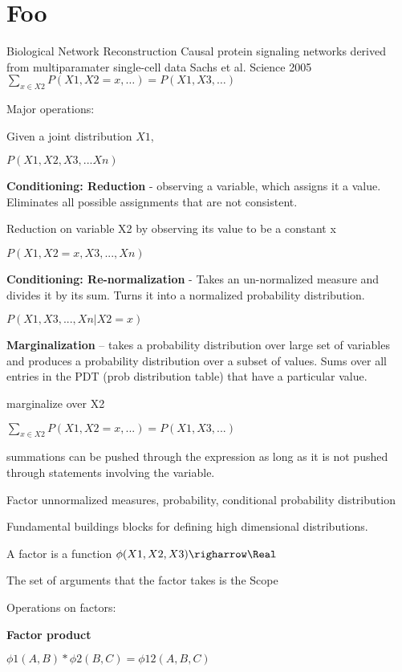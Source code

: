 \documentclass[10pt,twocolumn,letterpaper]{article}
\begin{document}
\section{Foo}
Biological Network Reconstruction 
Causal protein signaling networks derived from multiparamater single-cell data
Sachs et al. Science 2005
$\sum_{x \in X2} P(X1, X2=x, \ldots) = P(X1, X3, \ldots)$


Major operations: 

Given a joint distribution 
$X1$,

$P(X1, X2, X3, ... Xn)$

\textbf{Conditioning: Reduction} - observing a variable, which assigns it a value. 
Eliminates all possible assignments that are not consistent. 

Reduction on variable X2 by observing its value to be a constant x

$P(X1, X2=x, X3, ..., Xn)$

\textbf{Conditioning: Re-normalization} - Takes an un-normalized measure and divides it by
its sum. Turns it into a normalized probability distribution.

$P(X1, X3, ..., Xn | X2=x)$


\textbf{Marginalization} -- takes a probability distribution over large set of variables
and produces a probability distribution over a subset of values.  Sums over all 
entries in the PDT (prob distribution table) that have a particular value.

marginalize over X2

$\sum_{x \in X2} P(X1, X2=x, ...) = P(X1, X3, ...)$


summations can be pushed through the expression as long as it is not pushed through statements involving the variable. 



Factor \ni unnormalized measures, probability, conditional probability distribution

Fundamental buildings blocks for defining high dimensional distributions. 

A factor is a function $\phi(X1, X2, X3) \righarrow \Real$

The set of arguments that the factor takes is the Scope


Operations on factors:

\textbf{Factor product}

$\phi1(A, B) * \phi2(B, C) = \phi12(A, B, C)$
\end{document}
